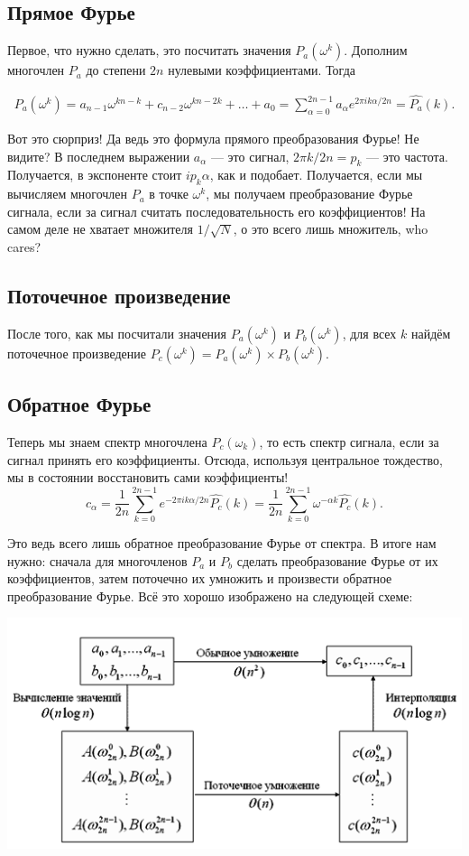 \documentclass[12pt]{article}
\begin{document}
\subsection*{Прямое Фурье}
Первое, что нужно сделать, это посчитать значения $P_a(\omega^k)$. Дополним многочлен $P_a$ до степени $2 n$ нулевыми коэффициентами. Тогда 

\begin{gather*}
P_a(\omega^k) = a_{n - 1} \omega^{kn - k} + c_{n - 2} \omega^{kn - 2k} + \ldots + a_0 =  \sum\limits_{\alpha  = 0}^{2 n - 1} a_{\alpha} e^{2 \pi i k \alpha / 2 n} = \hat{P_a}(k).
\end{gather*}

Вот это сюрприз! Да ведь это формула прямого преобразования Фурье! Не видите? В последнем выражении $a_{\alpha}$ --- это сигнал, $2 \pi k / 2n = p_k$ --- это частота. Получается, в экспоненте стоит $i p_k \alpha$, как и подобает. Получается, если мы вычисляем многочлен $P_a$ в точке $\omega^k$, мы получаем преобразование Фурье сигнала, если за сигнал считать последовательность его коэффициентов! На самом деле не хватает множителя $1 / \sqrt{N}$, о это всего лишь множитель, who cares? 

\subsection*{Поточечное произведение}
После того, как мы посчитали значения $P_a(\omega^k)$ и $P_b(\omega^k)$, для всех $k$ найдём поточечное произведение $P_c(\omega^k) = P_a(\omega^k) \times P_b(\omega^k).$
\subsection*{Обратное Фурье} 
Теперь мы знаем спектр многочлена $P_c(\omega_k)$, то есть спектр сигнала, если за сигнал принять его коэффициенты. Отсюда, используя центральное тождество, мы в состоянии восстановить сами коэффициенты! 
$$c_{\alpha} = \frac{1}{2 n} \sum\limits_{k = 0}^{2 n - 1} e^{-2 \pi i k \alpha / 2 n} \hat{P_c}(k) = \frac{1}{2 n} \sum \limits_{k = 0}^{2 n - 1} \omega^{-\alpha k} \hat{P_c}(k).$$

Это ведь всего лишь обратное преобразование Фурье от спектра. В итоге нам нужно: сначала для многочленов $P_a$ и $P_b$ сделать преобразование Фурье от их коэффициентов, затем поточечно их умножить и произвести обратное преобразование Фурье. Всё это хорошо изображено на следующей схеме:

\begin{center}
\includegraphics[scale=0.7]{schem.png}
\end{center}
\end{document}
